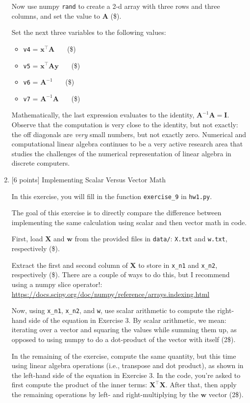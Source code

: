\documentclass[10pt]{article}
\begin{document}
\begin{enumerate}
Now use numpy {\tt rand} to create a 2-d array with three rows and three columns, and set the value to $\mathbf{A}$ (\$).

Set the next three variables to the following values:
\begin{itemize}
\item {\tt v4} = $\mathbf{x}^\top \mathbf{A}$ ~~~(\$)
\item {\tt v5} = $\mathbf{x}^\top \mathbf{A} \mathbf{y}$ ~~~(\$)
\item {\tt v6} = $\mathbf{A}^{-1}$ ~~~(\$)
\item {\tt v7} = $\mathbf{A}^{-1} \mathbf{A}$ ~~~(\$)
\end{itemize}

Mathematically, the last expression evaluates to the identity,  $\mathbf{A}^{-1} \mathbf{A} = \mathbf{I}$. Observe that the computation is very close to the identity, but not exactly: the off diagonals are {\em very} small numbers, but not exactly zero. Numerical and computational linear algebra continues to be a very active research area that studies the challenges of the numerical representation of linear algebra in discrete computers.




\item \label{prob:9} [6 points]
Implementing Scalar Versus Vector Math

In this exercise, you will fill in the function {\tt exercise\_9} in {\tt hw1.py}.

The goal of this exercise is to directly compare the difference between implementing the same calculation using scalar and then vector math in code.

First, load $\mathbf{X}$ and $\mathbf{w}$ from the provided files in {\tt data/}: {\tt X.txt} and {\tt w.txt}, respectively (\$).

Extract the first and second column of $\mathbf{X}$ to store in {\tt x\_n1} and {\tt x\_n2}, respectively (\$). There are a couple of ways to do this, but I recommend using a numpy slice operator!:\\
\url{https://docs.scipy.org/doc/numpy/reference/arrays.indexing.html}

Now, using {\tt x\_n1}, {\tt x\_n2}, and {\tt w}, use scalar arithmetic to compute the right-hand side of the equation in Exercise 3. By scalar arithmetic, we mean: iterating over a vector and squaring the values while summing them up, as opposed to using numpy to do a dot-product of the vector with itself (2\$).

In the remaining of the exercise, compute the same quantity, but this time using linear algebra operations (i.e., transpose and dot product), as shown in the left-hand side of the equation in Exercise 3. In the code, you're asked to first compute the product of the inner terms: ${\mathbf{X}^\top \mathbf{X}}$. After that, then apply the remaining operations by left- and right-multiplying by the $\mathbf{w}$ vector (2\$).


\end{enumerate}
\end{document}
